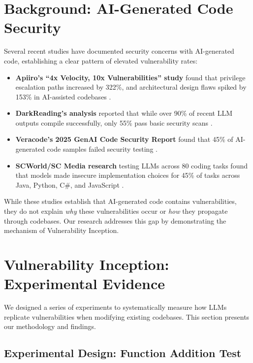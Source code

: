 \documentclass[11pt,a4paper]{article}
\begin{document}
\section{Background: AI-Generated Code Security}

Several recent studies have documented security concerns with AI-generated code, establishing a clear pattern of elevated vulnerability rates:

\begin{itemize}
\item \textbf{Apiiro's ``4x Velocity, 10x Vulnerabilities'' study} found that privilege escalation paths increased by 322\%, and architectural design flaws spiked by 153\% in AI-assisted codebases \cite{apiiro2025velocity}.

\item \textbf{DarkReading's analysis} reported that while over 90\% of recent LLM outputs compile successfully, only 55\% pass basic security scans \cite{gat2025insecure}.

\item \textbf{Veracode's 2025 GenAI Code Security Report} found that 45\% of AI-generated code samples failed security testing \cite{veracode2025security}.

\item \textbf{SCWorld/SC Media research} testing LLMs across 80 coding tasks found that models made insecure implementation choices for 45\% of tasks across Java, Python, C\#, and JavaScript \cite{scmedia2025insecure}.
\end{itemize}

While these studies establish that AI-generated code contains vulnerabilities, they do not explain \textit{why} these vulnerabilities occur or \textit{how} they propagate through codebases. Our research addresses this gap by demonstrating the mechanism of Vulnerability Inception.

\section{Vulnerability Inception: Experimental Evidence}

We designed a series of experiments to systematically measure how LLMs replicate vulnerabilities when modifying existing codebases. This section presents our methodology and findings.

\subsection{Experimental Design: Function Addition Test}
\end{document}

